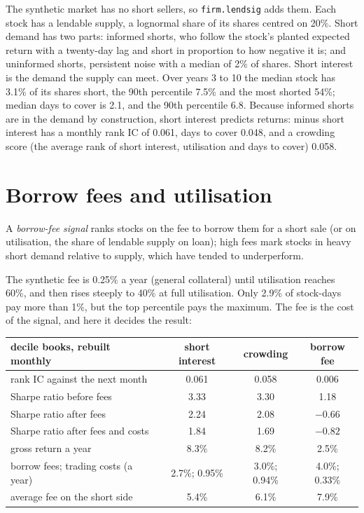 The synthetic market has no short sellers, so \texttt{firm.lendsig} adds them. Each stock has a lendable supply, a lognormal share of its shares centred on
20\%. Short demand has two parts: informed shorts, who follow the stock's planted expected return with a twenty-day lag and short in proportion to how
negative it is; and uninformed shorts, persistent noise with a median of 2\% of shares. Short interest is the demand the supply can meet. Over years 3 to
10 the median stock has 3.1\% of its shares short, the 90th percentile 7.5\% and the most shorted 54\%; median days to cover is 2.1, and the 90th
percentile 6.8. Because informed shorts are in the demand by construction, short interest predicts returns: minus short interest has a monthly rank IC of
0.061, days to cover 0.048, and a crowding score (the average rank of short interest, utilisation and days to cover) 0.058.

\section{Borrow fees and utilisation}

\begin{definition}\label{def:s1:short-interest-borrow-and-crowding:fee}
A \emph{borrow-fee signal} ranks stocks on the fee to borrow them for a short sale (or on utilisation, the share of lendable
supply on loan); high fees mark stocks in heavy short demand relative to supply, which have tended to underperform.
\end{definition}

The synthetic fee is 0.25\% a year (general collateral) until utilisation reaches 60\%, and then rises steeply to 40\% at full utilisation. Only 2.9\% of
stock-days pay more than 1\%, but the top percentile pays the maximum. The fee is the cost of the signal, and here it decides the result:

\begin{center}
\small
\begin{tabular}{@{}lccc@{}}
\toprule
decile books, rebuilt monthly & short interest & crowding & borrow fee\\
\midrule
rank IC against the next month & 0.061 & 0.058 & 0.006\\
Sharpe ratio before fees & 3.33 & 3.30 & 1.18\\
Sharpe ratio after fees & 2.24 & 2.08 & $-0.66$\\
Sharpe ratio after fees and costs & 1.84 & 1.69 & $-0.82$\\
gross return a year & 8.3\% & 8.2\% & 2.5\%\\
borrow fees; trading costs (a year) & 2.7\%; 0.95\% & 3.0\%; 0.94\% & 4.0\%; 0.33\%\\
average fee on the short side & 5.4\% & 6.1\% & 7.9\%\\
\bottomrule
\end{tabular}
\end{center}

